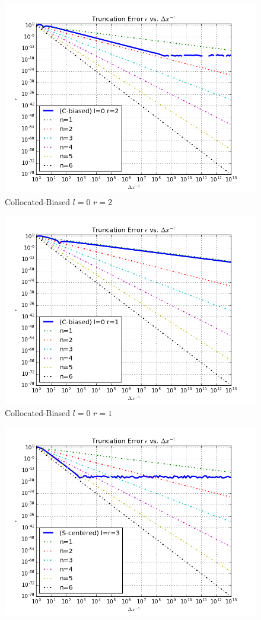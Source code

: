 \documentclass[12pt]{article}
\newenvironment{problem}[2][Problem]{\begin{trivlist}
\item[\hskip \labelsep {\bfseries #1}\hskip \labelsep {\bfseries #2.}]}{\end{trivlist}}
\begin{document}
\begin{problem}{1}
\begin{figure}[h]
  \includegraphics[scale=0.5]{cbl0r2}
 \caption{Collocated-Biased $l = 0$ $r = 2$}
\label{label}
\end{figure}
\begin{figure}
\centering
  \includegraphics[scale=0.5]{cbl0r1}
 \caption{Collocated-Biased $l = 0$ $r = 1$}
\label{label}
\end{figure}
\begin{figure}
\centering
  \includegraphics[scale=0.5]{scl3r3}

\end{figure}
\end{problem}
\end{document}
